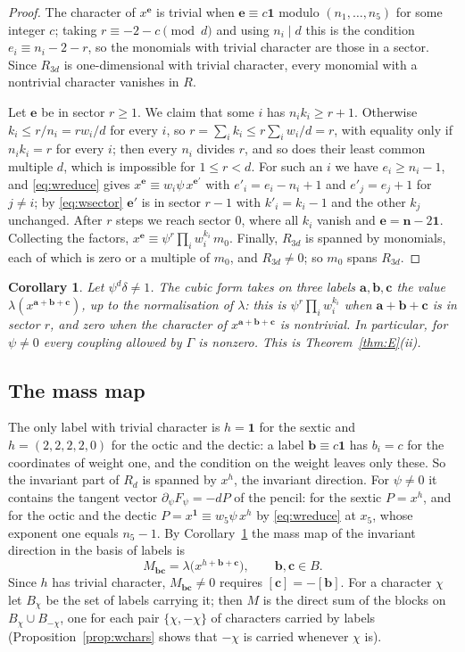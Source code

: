 \documentclass[11pt]{amsart}
\newtheorem{corollary}[theorem]{Corollary}
\theoremstyle{definition}
\theoremstyle{remark}
\newcommand{\bb}{\mathbf{b}}
\newcommand{\cc}{\mathbf{c}}
\newcommand{\va}{\mathbf{a}}
\newcommand{\ee}{\mathbf{e}}
\newcommand{\one}{\mathbf{1}}
\begin{document}
\begin{proof}
The character of $x^{\ee}$ is trivial when $\ee\equiv c\one$ modulo
$(n_1,\dots,n_5)$ for some integer $c$; taking $r\equiv-2-c\pmod d$ and
using $n_i\mid d$ this is the condition $e_i\equiv n_i-2-r$, so the
monomials with trivial character are those in a sector. Since $R_{3d}$ is
one-dimensional with trivial character, every monomial with a nontrivial
character vanishes in $R$.

Let $\ee$ be in sector $r\ge1$. We claim that some $i$ has $n_ik_i\ge
r+1$. Otherwise $k_i\le r/n_i=rw_i/d$ for every $i$, so $r=\sum_ik_i\le
r\sum_iw_i/d=r$, with equality only if $n_ik_i=r$ for every $i$; then every
$n_i$ divides $r$, and so does their least common multiple $d$, which is
impossible for $1\le r<d$. For such an $i$ we have $e_i\ge n_i-1$, and
\eqref{eq:wreduce} gives $x^{\ee}\equiv w_i\psi\,x^{\ee'}$ with
$e'_i=e_i-n_i+1$ and $e'_j=e_j+1$ for $j\ne i$; by \eqref{eq:wsector}
$\ee'$ is in sector $r-1$ with $k'_i=k_i-1$ and the other $k_j$ unchanged.
After $r$ steps we reach sector $0$, where all $k_i$ vanish and
$\ee=\mathbf n-2\one$. Collecting the factors,
$x^{\ee}\equiv\psi^r\prod_iw_i^{k_i}\,m_0$. Finally, $R_{3d}$ is spanned
by monomials, each of which is zero or a multiple of $m_0$, and
$R_{3d}\ne0$; so $m_0$ spans $R_{3d}$.
\end{proof}

\begin{corollary}\label{cor:wcouplings}
Let $\psi^d\delta\ne1$. The cubic form takes on three labels
$\va,\bb,\cc$ the value $\lambda(x^{\va+\bb+\cc})$, up to the normalisation
of $\lambda$: this is $\psi^r\prod_iw_i^{k_i}$ when $\va+\bb+\cc$ is in
sector $r$, and zero when the character of $x^{\va+\bb+\cc}$ is
nontrivial. In particular, for $\psi\ne0$ every coupling allowed by
$\Gamma$ is nonzero. This is Theorem~\ref{thm:E}(ii).
\end{corollary}

\subsection{The mass map}

The only label with trivial character is $h=\one$ for the sextic and
$h=(2,2,2,2,0)$ for the octic and the dectic: a label $\bb\equiv c\one$ has
$b_i=c$ for the coordinates of weight one, and the condition on the weight
leaves only these. So the invariant part of $R_d$ is spanned by $x^h$,
the invariant direction. For $\psi\ne0$ it contains the tangent vector
$\partial_\psi F_\psi=-dP$ of the pencil: for the sextic $P=x^h$, and for
the octic and the dectic $P=x^{\one}\equiv w_5\psi\,x^h$ by
\eqref{eq:wreduce} at $x_5$, whose exponent one equals $n_5-1$. By
Corollary~\ref{cor:wcouplings} the mass map of the invariant direction in
the basis of labels is
\[
M_{\bb\cc}=\lambda\big(x^{h+\bb+\cc}\big),\qquad \bb,\cc\in B .
\]
Since $h$ has trivial character, $M_{\bb\cc}\ne0$ requires
$[\cc]=-[\bb]$. For a character $\chi$ let $B_\chi$ be the set of labels
carrying it; then $M$ is the direct sum of the blocks on
$B_\chi\cup B_{-\chi}$, one for each pair $\{\chi,-\chi\}$ of characters
carried by labels (Proposition~\ref{prop:wchars} shows that $-\chi$ is
carried whenever $\chi$ is).
\end{document}
